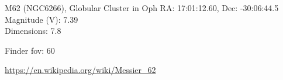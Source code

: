\begin{block}{M62 (NGC6266), Globular Cluster in Oph}
    RA: 17:01:12.60, Dec: -30:06:44.5 \\ 
    Magnitude (V): 7.39 \\ 
    Dimensions: 7.8 

    Finder fov: 60 

    \url{https://en.wikipedia.org/wiki/Messier_62} 
\end{block}